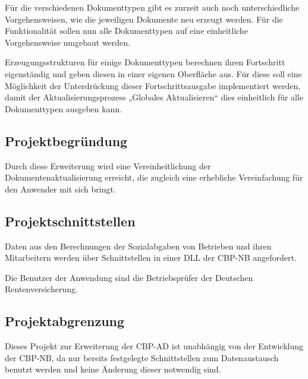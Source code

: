 Für die verschiedenen Dokumenttypen gibt es zurzeit auch noch unterschiedliche Vorgehensweisen, wie die jeweiligen Dokumente neu erzeugt werden. Für die Funktionalität  sollen nun alle Dokumenttypen auf eine einheitliche Vorgehensweise umgebaut werden.

Erzeugungsstrukturen für einige Dokumenttypen berechnen ihren Fortschritt eigenständig und geben diesen in einer eigenen Oberfläche aus. Für diese soll eine Möglichkeit der Unterdrückung dieser Fortschrittsausgabe implementiert werden, damit der Aktualisierungsprozess „Globales Aktualisieren“ dies einheitlich für alle Dokumenttypen ausgeben kann.


\subsection{Projektbegründung} 
\label{sec:Projektbegruendung}

Durch diese Erweiterung wird eine Vereinheitlichung der Dokumentenaktualisierung erreicht, die zugleich eine erhebliche Vereinfachung für den Anwender mit sich bringt.


\subsection{Projektschnittstellen} 
\label{sec:Projektschnittstellen}

Daten aus den Berechnungen der Sozialabgaben von Betrieben und ihren Mitarbeitern werden über Schnittstellen in einer \acs{DLL} der \acs{CBP-NB} angefordert.

Die Benutzer der Anwendung sind die Betriebsprüfer der Deutschen Rentenversicherung.


\subsection{Projektabgrenzung} 
\label{sec:Projektabgrenzung}

Dieses Projekt zur Erweiterung der \acs{CBP-AD} ist unabhängig von der Entwicklung der \ac{CBP-NB}, da nur bereits festgelegte Schnittstellen zum Datenaustausch benutzt werden und keine Änderung dieser notwendig sind.